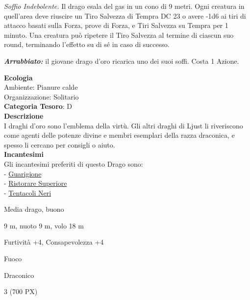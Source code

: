 \begin{multicols}{2}
{\emph{Soffio Indebolente.} Il drago esala del gas in un cono di 9 metri. Ogni creatura in quell'area deve riuscire un Tiro Salvezza di Tempra DC 23 o avere -1d6 ai tiri di attacco basati sulla Forza, prove di Forza, e Tiri Salvezza su Tempra per 1 minuto. Una creatura può ripetere il Tiro Salvezza al termine di ciascun suo round, terminando l'effetto su di sé in caso di successo.

\emph{\textbf{Arrabbiato:}} il giovane drago d'oro ricarica uno dei suoi soffi. Costa 1 Azione.

\textbf{Ecologia}\\
Ambiente: Pianure calde\\
Organizzazione: Solitario\\
\textbf{Categoria Tesoro}: D\\
\textbf{Descrizione}\\
I draghi d'oro sono l'emblema della virtù. Gli altri draghi di Ljust li riveriscono come agenti delle potenze divine e membri esemplari della razza draconica, e spesso li cercano per consigli o aiuto.\\
\textbf{Incantesimi}\\
Gli incantesimi preferiti di questo Drago sono:\\
- \hyperlink{Guarigione}{Guarigione}\\
- \hyperlink{Ristorare Superiore}{Ristorare Superiore}\\
- \hyperlink{Tentacoli Neri}{Tentacoli Neri}

\begin{description}[noitemsep, topsep=0pt, parsep=0pt, partopsep=0pt, itemsep=1pt, leftmargin=2.35cm,  labelwidth=2.2cm, itemindent=0cm, listparindent=0pt] %
\setlength{\baselineskip}{10pt}
\item[\textbf{Taglia/Tipo}] Media drago, buono
\item[\textbf{Caratt.}] 
\item[\textbf{Punti Ferita}] 
\item[\textbf{Movimento}] 9 m, nuoto 9 m, volo 18 m
\item[\textbf{Tiri Salvez.}] 
\item[\textbf{Comp.}] Furtività +4, Consapevolezza +4
\item[\textbf{Imm. Danni}] Fuoco
\item[\textbf{Sensi}] 
\item[\textbf{Linguaggi}] Draconico
\item[\textbf{Sfida}] 3 (700 PX)
\end{description}
\smallskip

}
\end{multicols}
